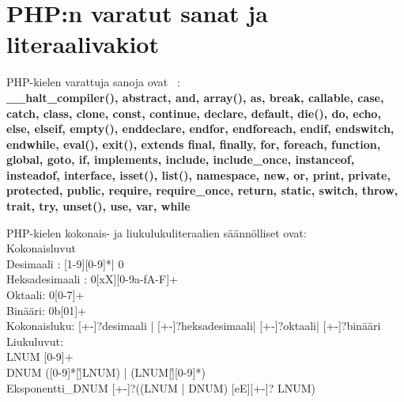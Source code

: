 \section{PHP:n varatut sanat ja literaalivakiot}
PHP-kielen varattuja sanoja ovat~ \cite{man_php_kws}:
\\
\textbf{
\_\_halt\_compiler(),  abstract, and, array(), as, break, callable, case, catch, class,
clone, const,  continue, declare, default,  die(), do, echo, else, elseif, empty(),   enddeclare, endfor, endforeach, endif, endswitch, endwhile, eval(), exit(), extends
final, finally, for, foreach, function, global, goto, if, implements, include, include\_once, instanceof, insteadof, interface, isset(), list(), namespace, new, or,      print, private, protected, public, require, require\_once, return, static, switch, throw, trait, try, unset(), use, var, while
}
\par
PHP-kielen kokonais- ja liukulukuliteraalien säännölliset ovat:~\cite{man_php_types_float}
\\
Kokonaisluvut \\
Desimaali : [1-9][0-9]*| 0 \\
Heksadesimaali : 0[xX][0-9a-fA-F]+ \\
Oktaali: 0[0-7]+ \\
Binääri: 0b[01]+ \\
Kokonaisluku: [+-]?desimaali | [+-]?heksadesimaali| [+-]?oktaali| [+-]?binääri \\

Liukuluvut:\\
LNUM          [0-9]+ \\
DNUM          ([0-9]*[\.]{LNUM}) | ({LNUM}[\.][0-9]*) \\
Eksponentti_DNUM [+-]?(({LNUM} | {DNUM}) [eE][+-]? {LNUM}) \\
